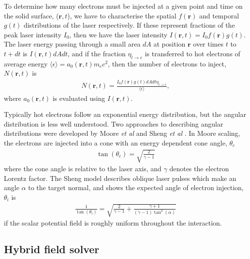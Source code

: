 \documentclass[12pt]{article}
\numberwithin{equation}{section}
\begin{document}
To determine how many electrons must be injected at a given point and time on the solid surface, ($\textbf{r},t$), we have to characterise the spatial $f(\textbf{r})$ and temporal $g(t)$ distributions of the laser respectively. If these represent fractions of the peak laser intensity $I_0$, then we have the laser intensity $I(\textbf{r},t) = I_0 f(\textbf{r}) g(t)$. The laser energy passing through a small area $dA$ at position $\textbf{r}$ over times $t$ to $t + dt$ is $I(\textbf{r},t) dA dt$, and if the fraction $\eta_{l\rightarrow e}$ is transferred to hot electrons of average energy $\langle\epsilon\rangle = a_0(\textbf{r},t) m_e c^2$, then the number of electrons to inject, $N(\textbf{r},t)$ is
%
\begin{align} \label{eq:inject_no}
	N(\textbf{r},t) = \frac{I_0 f(\textbf{r}) g(t) dA dt \eta_{l\rightarrow e}}  {\langle\epsilon\rangle}, 
\end{align}
%
where $a_0(\textbf{r},t)$ is evaluated using $I(\textbf{r},t)$.

Typically hot electrons follow an exponential energy distribution, but the angular distribution is less well understood. Two approaches to describing angular distributions were developed by Moore \textit{et al} \cite{theory:injector:moore} and Sheng \textit{et al} \cite{theory:injector:sheng}. In Moore scaling, the electrons are injected into a cone with an energy dependent cone angle, $\theta_c$
%
\begin{align} \label{eq:Moore}
 \tan(\theta_c) = \sqrt{\frac{2}{\gamma-1}} 
\end{align}
%
where the cone angle is relative to the laser axis, and $\gamma$ denotes the electron Lorentz factor. The Sheng model describes oblique laser pulses which make an angle $\alpha$ to the target normal, and shows the expected angle of electron injection, $\theta_i$ is
%
\begin{align} \label{eq:Sheng}
 \frac{1}{\tan(\theta_i)} = \sqrt{\frac{2}{\gamma-1} + \frac{\gamma + 1}{(\gamma - 1)\tan^2(\alpha)}} 
\end{align} 
%
if the scalar potential field is roughly uniform throughout the interaction.

\subsection{Hybrid field solver} \label{sec:theory:fields}
\end{document}
